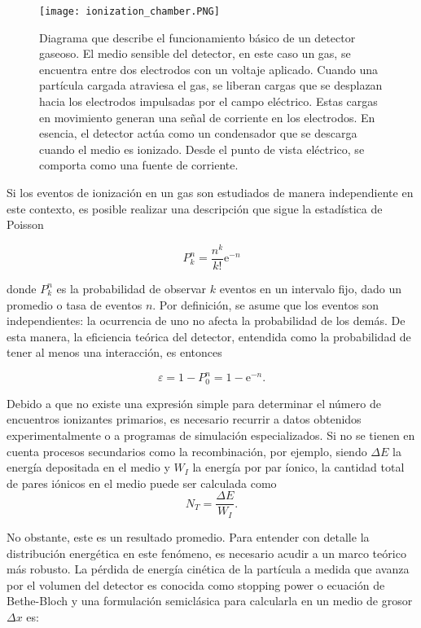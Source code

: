 \documentclass{article}
\begin{document}
\begin{figure}[H]
    \centering
    \texttt{[image: ionization\_chamber.PNG]}
    \caption{Diagrama que describe el funcionamiento básico de un detector gaseoso. El medio sensible del detector, en este caso un gas, se encuentra entre dos electrodos con un voltaje aplicado. Cuando una partícula cargada atraviesa el gas, se liberan cargas que se desplazan hacia los electrodos impulsadas por el campo eléctrico. Estas cargas en movimiento generan una señal de corriente en los electrodos. En esencia, el detector actúa como un condensador que se descarga cuando el medio es ionizado. Desde el punto de vista eléctrico, se comporta como una fuente de corriente.}
    \label{fig:ionization_chamber1}
\end{figure}

\noindent Si los eventos de ionización en un gas son estudiados de manera independiente en este contexto, es posible realizar una descripción que sigue la estadística de Poisson

\begin{equation}
    \label{eq:poisson}
    P_k^n=\frac{n^k}{k!} \mathrm{e}^{-n}
\end{equation}

\noindent donde $ P_k^n$ es la probabilidad de observar $k$ eventos en un intervalo fijo, dado un promedio o tasa de eventos $n$. Por definición, se asume que los eventos son independientes: la ocurrencia de uno no afecta la probabilidad de los demás. De esta manera, la eficiencia teórica del detector, entendida como la probabilidad de tener al menos una interacción, es entonces

\begin{equation}
    \label{eq:det_eff}
    \varepsilon=1-P_0^n=1-\mathrm{e}^{-n} .
\end{equation}

\noindent Debido a que no existe una expresión simple para determinar el número de encuentros ionizantes primarios, es necesario recurrir a datos obtenidos experimentalmente o a programas de simulación especializados. Si no se tienen en cuenta procesos secundarios como la recombinación, por ejemplo, siendo $\Delta E$ la energía depositada en el medio y $W_{I}$ la energía por par íonico, la cantidad total de pares iónicos en el medio puede ser calculada como 
\begin{equation}
    \label{eq:num_ion}
    N_{T} = \frac{\Delta E}{W_{I}}.
\end{equation}

\noindent No obstante, este es un resultado promedio. Para entender con detalle la distribución energética en este fenómeno, es necesario acudir a un marco teórico más robusto. La pérdida de energía cinética de la partícula a medida que avanza por el volumen del detector es conocida como stopping power o ecuación de Bethe-Bloch y una formulación semiclásica para calcularla en un medio de grosor $\Delta x$ es: 
\end{document}
